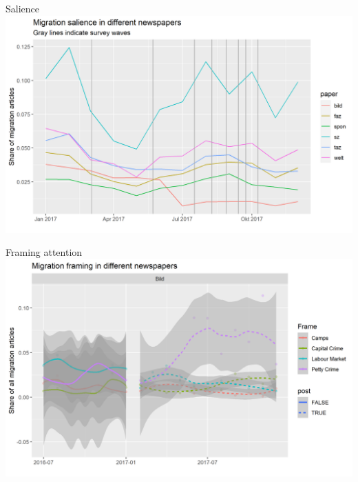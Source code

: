 \documentclass[
  ignorenonframetext,
]{beamer}
\begin{document}
\begin{frame}[allowframebreaks]{Salience}
\protect\hypertarget{salience}{}
\includegraphics{vis/salience_papers_focus.png}
\end{frame}

\begin{frame}[allowframebreaks]{Framing attention}
\protect\hypertarget{framing-attention}{}
\includegraphics{vis/frames_papers_focus_pres.png}
\end{frame}
\end{document}
